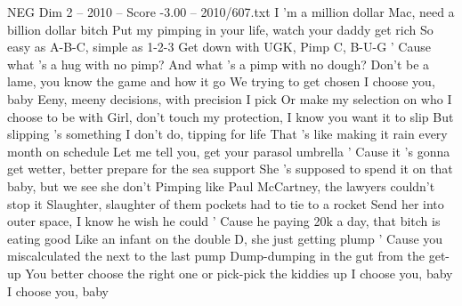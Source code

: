 \begin{textsample}{NEG Dim 2 – 2010 – Score -3.00 – 2010/607.txt}
I 'm a million dollar Mac, need a billion dollar bitch Put my pimping in your life, watch your daddy get rich So easy as A-B-C, simple as 1-2-3 Get down with UGK, Pimp C, B-U-G ' Cause what 's a hug with no pimp?
And what 's a pimp with no dough?
Don't be a lame, you know the game and how it go We trying to get chosen I choose you, baby Eeny, meeny decisions, with precision I pick Or make my selection on who I choose to be with Girl, don't touch my protection, I know you want it to slip But slipping 's something I don't do, tipping for life That 's like making it rain every month on schedule Let me tell you, get your parasol umbrella ' Cause it 's gonna get wetter, better prepare for the sea support She 's supposed to spend it on that baby, but we see she don't Pimping like Paul McCartney, the lawyers couldn't stop it Slaughter, slaughter of them pockets had to tie to a rocket Send her into outer space, I know he wish he could ' Cause he paying 20k a day, that bitch is eating good Like an infant on the double D, she just getting plump ' Cause you miscalculated the next to the last pump Dump-dumping in the gut from the get-up You better choose the right one or pick-pick the kiddies up I choose you, baby I choose you, baby

\end{textsample}
